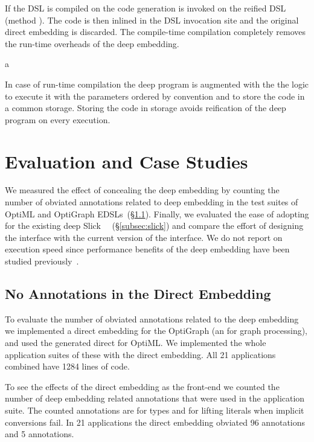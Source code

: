If the DSL is compiled on the code generation is invoked on the reified DSL (method ). The code is then inlined in the
DSL invocation site and the original direct embedding is discarded. The compile-time compilation completely removes the run-time overheads of the deep embedding.

a

In case of run-time compilation the deep program is augmented with the the logic
 to execute it with the parameters ordered by convention and to store
 the code in a common storage. Storing the code in storage avoids reification of the
 deep program on every execution.


\chapter{Evaluation and Case Studies}
\label{sec:ch2-evaluation}

We measured the effect of concealing the deep embedding by counting the
number of obviated annotations related to deep embedding in the test suites of OptiML
and OptiGraph EDSLs~(\S \ref{subsec:correctness}). Finally, we evaluated the ease
of adopting \yy for the existing deep \edsl Slick~\cite{slick}
~(\S \ref{subsec:slick}) and compare the effort of designing the interface with
the current version of the interface. We do not report on execution speed since performance
benefits of the deep embedding have been studied previously~\cite{rompf_optimizing_2013,forge}.


\section{No Annotations in the Direct Embedding}
\label{subsec:correctness}

To evaluate the number of obviated annotations related to the deep embedding we
implemented a direct embedding for the OptiGraph \edsl (an \edsl for graph
processing), and used the generated direct \edsl for OptiML. We implemented
the whole application suites of these \edsls with the direct embedding. All 21
applications combined have 1284 lines of code.

To see the effects of the direct embedding as the front-end we counted the
number of deep embedding related annotations that were used in the application
suite. The counted annotations are  for types and 
for lifting literals when implicit conversions fail. In 21 applications
the direct embedding obviated 96  annotations and 5
 annotations.

